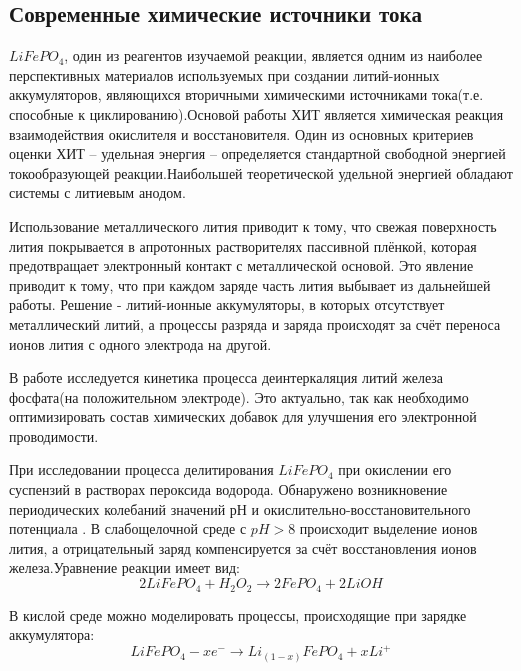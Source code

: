 \documentclass[a4paper,12pt]{article} %
\begin{document}
\subsection{Современные химические источники тока}\par
$LiFePO_4$, один из реагентов изучаемой реакции, является одним из наиболее перспективных материалов используемых при создании литий-ионных аккумуляторов, являющихся вторичными химическими источниками тока(т.е. способные к циклированию).Основой работы ХИТ является химическая реакция взаимодействия окислителя и восстановителя. Один из основных критериев оценки ХИТ – удельная энергия – определяется стандартной свободной энергией токообразующей реакции.Наибольшей теоретической удельной энергией обладают системы с литиевым анодом. \par 
Использование металлического лития приводит к тому, что свежая поверхность лития покрывается в апротонных растворителях пассивной плёнкой, которая предотвращает электронный контакт с металлической основой. Это явление приводит к тому, что при каждом заряде часть лития выбывает из дальнейшей работы. Решение - литий-ионные аккумуляторы, в которых отсутствует металлический литий, а процессы разряда и заряда происходят за счёт переноса ионов лития с одного электрода на другой.\par 
В работе исследуется кинетика процесса деинтеркаляция литий железа фосфата(на положительном электроде). Это актуально, так как необходимо оптимизировать состав химических добавок для улучшения его электронной проводимости.\par  
При исследовании процесса делитирования $LiFePO_4$ при окислении его суспензий в растворах пероксида водорода. Обнаружено возникновение периодических колебаний значений рН и окислительно-восстановительного потенциала .
В слабощелочной среде с $pH>8$ происходит выделение ионов лития, а отрицательный заряд компенсируется за счёт восстановления ионов железа.Уравнение реакции имеет вид:$$2LiFePO_4+H_2O_2 \rightarrow 2FePO_4 + 2LiOH$$\par 
В кислой среде можно моделировать процессы, происходящие при зарядке аккумулятора:
$$LiFePO_4 - xe^- \rightarrow Li_{(1-x)}FePO_4 + xLi^+$$\par 
\end{document}
